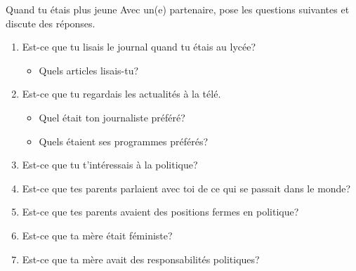 \begin{frame}{Quand tu étais plus jeune}
  Avec un(e) partenaire, pose les questions suivantes et discute des réponses.
  \begin{enumerate}
    \item Est-ce que tu lisais le journal quand tu étais au lycée?
    \begin{itemize}
      \item Quels articles lisais-tu?
    \end{itemize}
    \item Est-ce que tu regardais les actualités à la télé.
    \begin{itemize}
      \item Quel était ton journaliste préféré?
      \item Quels étaient ses programmes préférés?
    \end{itemize}
    \item Est-ce que tu t'intéressais à la politique?
    \item Est-ce que tes parents parlaient avec toi de ce qui se passait dans le monde?
    \item Est-ce que tes parents avaient des positions fermes en politique?
    \item Est-ce que ta mère était féministe?
    \item Est-ce que ta mère avait des responsabilités politiques?
  \end{enumerate}
\end{frame}